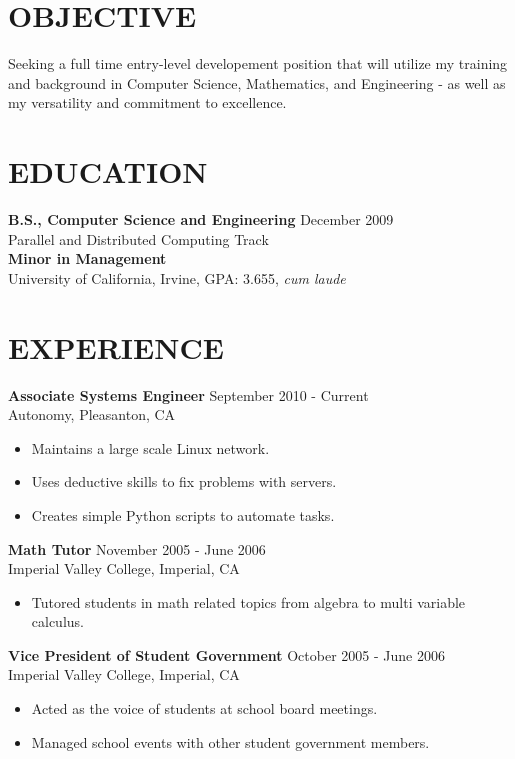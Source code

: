 \documentclass[10pt,line,margin]{res}
\begin{document}
\address{4245 Stanley Blvd Pleasanton, CA}
\address{jobs@apeschel.fastmail.fm or (760)-791-7301}

\begin{resume}
\vfill
\section{OBJECTIVE}
    Seeking a full time entry-level developement position that will utilize my
    training and background in Computer Science, Mathematics, and
    Engineering - as well as my versatility and commitment to excellence.

\section{EDUCATION}
    {\bf B.S., Computer Science and Engineering} \hfill December 2009 \\
    Parallel and Distributed Computing Track \\
    {\bf Minor in Management} \\
    University of California, Irvine, GPA: 3.655, \textit{cum laude}

\section{EXPERIENCE}
    {\bf Associate Systems Engineer} \hfill September 2010 - Current \\
    Autonomy, Pleasanton, CA
    \begin{itemize} \itemsep -2pt
    \item Maintains a large scale Linux network.
    \item Uses deductive skills to fix problems with servers.
    \item Creates simple Python scripts to automate tasks.
    \end{itemize}

    {\bf Math Tutor} \hfill November 2005 - June 2006 \\
    Imperial Valley College, Imperial, CA
    \begin{itemize} \itemsep -2pt
    \item Tutored students in math related topics from
    algebra to multi variable calculus.
    \end{itemize}

    {\bf Vice President of Student Government}
    \hfill  October 2005 - June 2006 \\
    Imperial Valley College, Imperial, CA
    \begin{itemize} \itemsep -2pt
    \item   Acted as the voice of students at school board meetings.
    \item Managed school events with other student government
    members.
    \end{itemize}


\end{resume}
\end{document}
